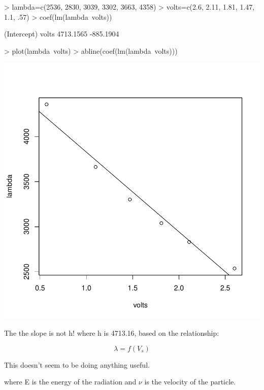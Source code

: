 \documentclass{article}
\begin{document}
\begin{Schunk}
\begin{Sinput}
> lambda=c(2536, 2830, 3039, 3302, 3663, 4358)
> volts=c(2.6, 2.11, 1.81, 1.47, 1.1, .57)
> coef(lm(lambda~volts))
\end{Sinput}
\begin{Soutput}
(Intercept)       volts 
  4713.1565   -885.1904 
\end{Soutput}
\begin{Sinput}
> plot(lambda~volts)
> abline(coef(lm(lambda~volts)))
\end{Sinput}
\end{Schunk}
\includegraphics{Chemistry1-005}

The the slope is not h!  where h is 4713.16, based on the relationship:

\begin{equation}
\lambda = f(V_s)
\end{equation}

This doesn't seem to be doing anything useful. 

\noindent where E is the energy of the radiation and $\nu$ is the velocity of the particle. 
\end{document}
